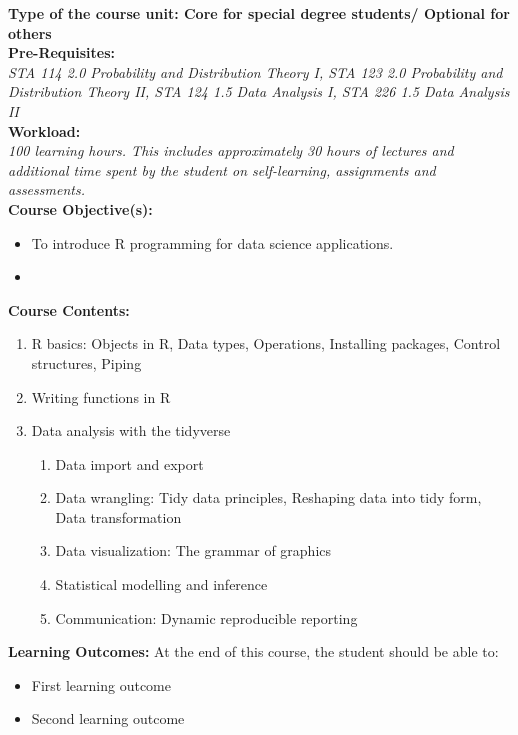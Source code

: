 \documentclass[a4paper,12pt]{article}
\begin{document}
\noindent\textbf{Type of the course unit: Core for special degree students/ Optional for others}\\

\noindent\textbf{Pre-Requisites:}\\
\noindent\textit{{ STA 114 2.0 Probability and Distribution Theory I, STA 123 2.0 Probability and Distribution Theory II, STA 124 1.5 Data Analysis I, STA 226 1.5 Data Analysis II}}\\

\noindent\textbf{Workload:}\\
\noindent\textit{{ 100 learning hours. This includes approximately 30 hours of lectures and additional time spent by the student on self-learning, assignments and assessments.}}\\

\noindent\textbf{Course Objective(s):}
\begin{itemize}
	\setlength\itemsep{0.1mm}
	\item To introduce R programming for data science applications.
	\item 
\end{itemize}
\noindent\textbf{Course Contents:}
\begin{enumerate}[label*=\arabic*.]
	\setlength\itemsep{0.1mm}
	\item R basics: Objects in R, Data types, Operations, Installing packages, Control structures, Piping
	\item Writing functions in R
	\item Data analysis with the tidyverse
	\begin{enumerate}[label*=\arabic*.]
	\item Data import and export
	\item Data wrangling: Tidy data principles, Reshaping data into tidy form, Data transformation
	\item Data visualization: The grammar of graphics
	\item Statistical	modelling	and	inference
	\item Communication: Dynamic reproducible reporting
	\end{enumerate}
\end{enumerate}

\noindent\textbf{Learning Outcomes:}
At the end of this course, the student should be able to:
\begin{itemize}
	\setlength\itemsep{0.1mm}
	\item First learning outcome
	\item Second learning outcome
\end{itemize}
\end{document}
